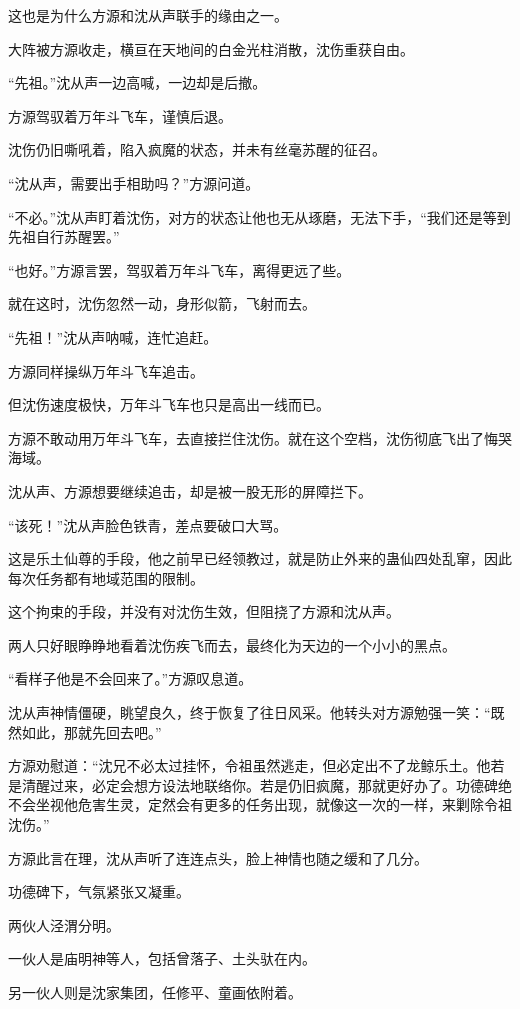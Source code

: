 \begin{this_body}
这也是为什么方源和沈从声联手的缘由之一。

大阵被方源收走，横亘在天地间的白金光柱消散，沈伤重获自由。

“先祖。”沈从声一边高喊，一边却是后撤。

方源驾驭着万年斗飞车，谨慎后退。

沈伤仍旧嘶吼着，陷入疯魔的状态，并未有丝毫苏醒的征召。

“沈从声，需要出手相助吗？”方源问道。

“不必。”沈从声盯着沈伤，对方的状态让他也无从琢磨，无法下手，“我们还是等到先祖自行苏醒罢。”

“也好。”方源言罢，驾驭着万年斗飞车，离得更远了些。

就在这时，沈伤忽然一动，身形似箭，飞射而去。

“先祖！”沈从声呐喊，连忙追赶。

方源同样操纵万年斗飞车追击。

但沈伤速度极快，万年斗飞车也只是高出一线而已。

方源不敢动用万年斗飞车，去直接拦住沈伤。就在这个空档，沈伤彻底飞出了悔哭海域。

沈从声、方源想要继续追击，却是被一股无形的屏障拦下。

“该死！”沈从声脸色铁青，差点要破口大骂。

这是乐土仙尊的手段，他之前早已经领教过，就是防止外来的蛊仙四处乱窜，因此每次任务都有地域范围的限制。

这个拘束的手段，并没有对沈伤生效，但阻挠了方源和沈从声。

两人只好眼睁睁地看着沈伤疾飞而去，最终化为天边的一个小小的黑点。

“看样子他是不会回来了。”方源叹息道。

沈从声神情僵硬，眺望良久，终于恢复了往日风采。他转头对方源勉强一笑：“既然如此，那就先回去吧。”

方源劝慰道：“沈兄不必太过挂怀，令祖虽然逃走，但必定出不了龙鲸乐土。他若是清醒过来，必定会想方设法地联络你。若是仍旧疯魔，那就更好办了。功德碑绝不会坐视他危害生灵，定然会有更多的任务出现，就像这一次的一样，来剿除令祖沈伤。”

方源此言在理，沈从声听了连连点头，脸上神情也随之缓和了几分。

功德碑下，气氛紧张又凝重。

两伙人泾渭分明。

一伙人是庙明神等人，包括曾落子、土头驮在内。

另一伙人则是沈家集团，任修平、童画依附着。


\end{this_body}
